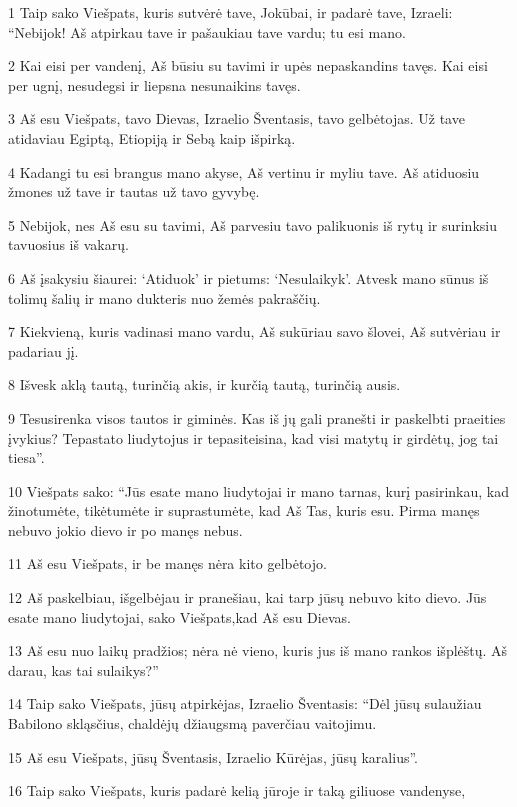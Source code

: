 \par 1 Taip sako Viešpats, kuris sutvėrė tave, Jokūbai, ir padarė tave, Izraeli: “Nebijok! Aš atpirkau tave ir pašaukiau tave vardu; tu esi mano. 
\par 2 Kai eisi per vandenį, Aš būsiu su tavimi ir upės nepaskandins tavęs. Kai eisi per ugnį, nesudegsi ir liepsna nesunaikins tavęs. 
\par 3 Aš esu Viešpats, tavo Dievas, Izraelio Šventasis, tavo gelbėtojas. Už tave atidaviau Egiptą, Etiopiją ir Sebą kaip išpirką. 
\par 4 Kadangi tu esi brangus mano akyse, Aš vertinu ir myliu tave. Aš atiduosiu žmones už tave ir tautas už tavo gyvybę. 
\par 5 Nebijok, nes Aš esu su tavimi, Aš parvesiu tavo palikuonis iš rytų ir surinksiu tavuosius iš vakarų. 
\par 6 Aš įsakysiu šiaurei: ‘Atiduok’ ir pietums: ‘Nesulaikyk’. Atvesk mano sūnus iš tolimų šalių ir mano dukteris nuo žemės pakraščių. 
\par 7 Kiekvieną, kuris vadinasi mano vardu, Aš sukūriau savo šlovei, Aš sutvėriau ir padariau jį. 
\par 8 Išvesk aklą tautą, turinčią akis, ir kurčią tautą, turinčią ausis. 
\par 9 Tesusirenka visos tautos ir giminės. Kas iš jų gali pranešti ir paskelbti praeities įvykius? Tepastato liudytojus ir tepasiteisina, kad visi matytų ir girdėtų, jog tai tiesa”. 
\par 10 Viešpats sako: “Jūs esate mano liudytojai ir mano tarnas, kurį pasirinkau, kad žinotumėte, tikėtumėte ir suprastumėte, kad Aš Tas, kuris esu. Pirma manęs nebuvo jokio dievo ir po manęs nebus. 
\par 11 Aš esu Viešpats, ir be manęs nėra kito gelbėtojo. 
\par 12 Aš paskelbiau, išgelbėjau ir pranešiau, kai tarp jūsų nebuvo kito dievo. Jūs esate mano liudytojai,­ sako Viešpats,­kad Aš esu Dievas. 
\par 13 Aš esu nuo laikų pradžios; nėra nė vieno, kuris jus iš mano rankos išplėštų. Aš darau, kas tai sulaikys?” 
\par 14 Taip sako Viešpats, jūsų atpirkėjas, Izraelio Šventasis: “Dėl jūsų sulaužiau Babilono skląsčius, chaldėjų džiaugsmą paverčiau vaitojimu. 
\par 15 Aš esu Viešpats, jūsų Šventasis, Izraelio Kūrėjas, jūsų karalius”. 
\par 16 Taip sako Viešpats, kuris padarė kelią jūroje ir taką giliuose vandenyse, 
